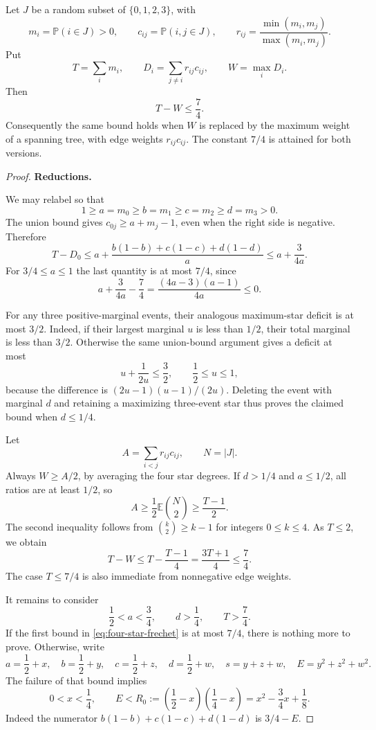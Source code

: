 \begin{lemma}\label{lem:four-event-star}
Let $J$ be a random subset of $\{0,1,2,3\}$, with
\[
 m_i=\mathbb P(i\in J)>0,\qquad
 c_{ij}=\mathbb P(i,j\in J),\qquad
 r_{ij}=\frac{\min(m_i,m_j)}{\max(m_i,m_j)}.
\]
Put
\[
 T=\sum_i m_i,\qquad
 D_i=\sum_{j\ne i}r_{ij}c_{ij},\qquad W=\max_iD_i.
\]
Then
\[
 T-W\le\frac74.
\]
Consequently the same bound holds when $W$ is replaced by the maximum
weight of a spanning tree, with edge weights $r_{ij}c_{ij}$.
The constant $7/4$ is attained for both versions.
\end{lemma}
\begin{proof}
\medskip\noindent\textbf{Reductions.}

We may relabel so that
\[
 1\ge a=m_0\ge b=m_1\ge c=m_2\ge d=m_3>0.
\]
The union bound gives $c_{0j}\ge a+m_j-1$, even when the right side
is negative.  Therefore
\begin{equation}\label{eq:four-star-frechet}
 T-D_0
 \le a+\frac{b(1-b)+c(1-c)+d(1-d)}a
 \le a+\frac{3}{4a}.
\end{equation}
For $3/4\le a\le1$ the last quantity is at most $7/4$, since
\[
 a+\frac{3}{4a}-\frac74
 =\frac{(4a-3)(a-1)}{4a}\le0.
\]

For any three positive-marginal events, their analogous maximum-star
deficit is at most $3/2$.  Indeed, if their largest marginal $u$ is
less than $1/2$, their total marginal is less than $3/2$.  Otherwise
the same union-bound argument gives a deficit at most
\[
 u+\frac1{2u}\le\frac32,\qquad \frac12\le u\le1,
\]
because the difference is $(2u-1)(u-1)/(2u)$.
Deleting the event with marginal $d$ and retaining a maximizing
three-event star thus proves the claimed bound when $d\le1/4$.

Let
\[
 A=\sum_{i<j}r_{ij}c_{ij},\qquad N=|J|.
\]
Always $W\ge A/2$, by averaging the four star degrees.
If $d>1/4$ and $a\le1/2$, all ratios are at least $1/2$, so
\[
 A\ge\frac12\mathbb E\binom N2\ge\frac{T-1}{2}.
\]
The second inequality follows from
$\binom k2\ge k-1$ for integers $0\le k\le4$.
As $T\le2$, we obtain
\[
 T-W\le T-\frac{T-1}{4}
       =\frac{3T+1}{4}\le\frac74.
\]
The case $T\le7/4$ is also immediate from nonnegative edge weights.

It remains to consider
\begin{equation}\label{eq:four-star-remaining}
 \frac12<a<\frac34,\qquad d>\frac14,\qquad T>\frac74.
\end{equation}
If the first bound in \eqref{eq:four-star-frechet} is at most $7/4$, there is
nothing more to prove.  Otherwise, write
\[
 a=\frac12+x,\quad b=\frac12+y,\quad c=\frac12+z,\quad
 d=\frac12+w,\quad s=y+z+w,\quad E=y^2+z^2+w^2.
\]
The failure of that bound implies
\begin{equation}\label{eq:four-star-ellipse}
 0<x<\frac14,\qquad
 E<R_0:=\left(\frac12-x\right)\left(\frac14-x\right)
       =x^2-\frac34x+\frac18.
\end{equation}
Indeed the numerator $b(1-b)+c(1-c)+d(1-d)$ is $3/4-E$.


\end{proof}
